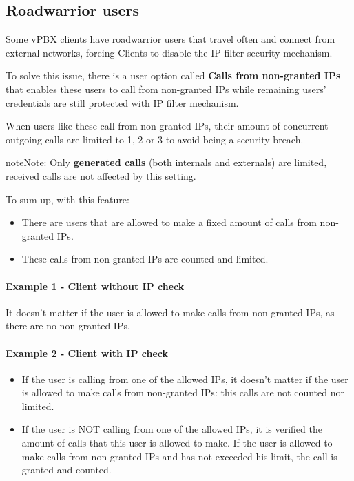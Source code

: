 \documentclass[letterpaper,10pt,english]{sphinxmanual}
\begin{document}
\subsection{Roadwarrior users}
\label{security_and_maintenance/security/authorized_ip_ranges:roadwarrior-users}\label{security_and_maintenance/security/authorized_ip_ranges:id1}
Some vPBX clients have roadwarrior users that travel often and connect from external
networks, forcing Clients to disable the IP filter security mechanism.

To solve this issue, there is a user option called \textbf{Calls from non-granted IPs}
that enables these users to call from non-granted IPs while remaining users' credentials
are still protected with IP filter mechanism.

When users like these call from non-granted IPs, their amount of concurrent
outgoing calls are limited to 1, 2 or 3 to avoid being a security breach.

\begin{notice}{note}{Note:}
Only \textbf{generated calls} (both internals and externals) are limited,
received calls are not affected by this setting.
\end{notice}

To sum up, with this feature:
\begin{itemize}
\item {} 
There are users that are allowed to make a fixed amount of calls from
non-granted IPs.

\item {} 
These calls from non-granted IPs are counted and limited.

\end{itemize}
\paragraph{Example 1 - Client without IP check}

It doesn't matter if the user is allowed to make calls from non-granted IPs,
as there are no non-granted IPs.
\paragraph{Example 2 - Client with IP check}
\begin{itemize}
\item {} 
If the user is calling from one of the allowed IPs,
it doesn't matter if the user is allowed to make calls from non-granted IPs:
this calls are not counted nor limited.

\item {} 
If the user is NOT calling from one of the allowed IPs, it is verified the
amount of calls that this user is allowed to make. If the user is allowed to
make calls from non-granted IPs and has not exceeded his limit, the call is
granted and counted.

\end{itemize}
\end{document}
